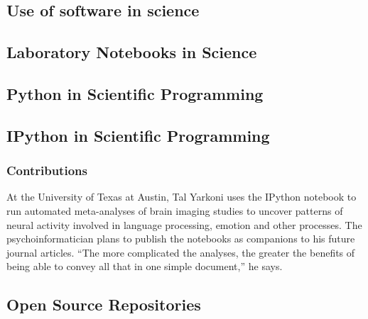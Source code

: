 
\subsection{Use of software in science}


\subsection{Laboratory Notebooks in Science}



\subsection{Python in Scientific Programming}


\subsection{IPython in Scientific Programming}



\subsubsection{Contributions}


At the University of Texas at Austin, Tal Yarkoni
uses the IPython notebook to run automated
meta-analyses of brain imaging studies to
uncover patterns of neural activity involved in
language processing, emotion and other processes.
The psychoinformatician plans to publish
the notebooks as companions to his future
journal articles. “The more complicated the
analyses, the greater the benefits of being able to convey all that in one simple document,” he says.
\cite{shen2014interactive}

\subsection{Open Source Repositories}


